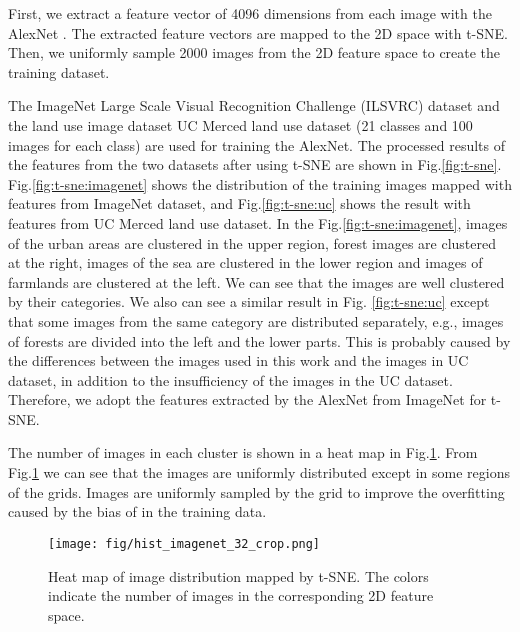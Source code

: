 \documentclass[10pt,twocolumn,letterpaper]{article}
\begin{document}
First, we extract a feature vector of 4096 dimensions from each image with the AlexNet \cite{NIPS2012_4824}. The extracted feature vectors are mapped to the 2D space with t-SNE. Then, we uniformly sample 2000 images from the 2D feature space to create the training dataset.

The ImageNet Large Scale Visual Recognition Challenge (ILSVRC) dataset \cite{deng2009imagenet} and the land use image dataset UC Merced land use dataset \cite{yang2010bag} (21 classes and 100 images for each class) are used for training the AlexNet. The processed results of the features from the two datasets after using t-SNE are shown in Fig.\ref{fig:t-sne}. Fig.\ref{fig:t-sne:imagenet} shows the distribution of the training images mapped with features from ImageNet dataset, and Fig.\ref{fig:t-sne:uc} shows the result with features from UC Merced land use dataset. In the Fig.\ref{fig:t-sne:imagenet}, images of the urban areas are clustered in the upper region, forest images are clustered at the right, images of the sea are clustered  in the lower region and images of farmlands are clustered  at the left. We can see that the images are well clustered by their categories. We also can see a similar result in Fig. \ref{fig:t-sne:uc} except that some images from the same category are distributed separately, e.g., images of forests are divided into the left and the lower parts. This is probably caused by the differences between the images used in this work and the images in UC dataset, in addition to the insufficiency of the images in the UC dataset. Therefore, we adopt the features extracted by the AlexNet from ImageNet for t-SNE.

The number of images in each cluster is shown in a heat map in Fig.\ref{fig:hist_t-SNE}. From Fig.\ref{fig:hist_t-SNE} we can see that the images are uniformly distributed except in some regions of the grids. Images are uniformly sampled by the grid to improve the overfitting caused by the bias of in the training data.

\begin{figure}[htpb]
\begin{center}
\hspace*{0mm}\texttt{[image: fig/hist\_imagenet\_32\_crop.png]}
\caption{Heat map of image distribution mapped by t-SNE. The colors indicate the number of images in the corresponding 2D feature space.}
\label{fig:hist_t-SNE}
\end{center}
\end{figure}
\end{document}
